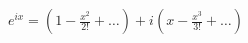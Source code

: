 \documentclass[preview]{standalone}
\begin{document}
\begin{align*}
e^{ix} = (1 - \frac{x^2}{2!} + \dots) + i(x - \frac{x^3}{3!} + \dots)
\end{align*}
\end{document}
